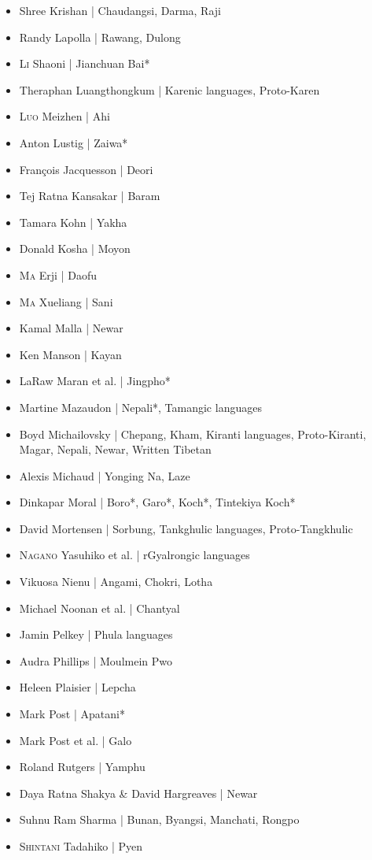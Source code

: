 \begin{itemize}
\item Shree Krishan | Chaudangsi, Darma, Raji
\item Randy Lapolla | Rawang, Dulong
\item \textsc{Li} Shaoni | Jianchuan Bai*
\item Theraphan Luangthongkum | Karenic languages, Proto-Karen
\item \textsc{Luo} Meizhen | Ahi
\item Anton Lustig | Zaiwa*
\item François Jacquesson | Deori
\item Tej Ratna Kansakar | Baram
\item Tamara Kohn | Yakha
\item Donald Kosha | Moyon
\item \textsc{Ma} Erji | Daofu
\item \textsc{Ma} Xueliang | Sani
\item Kamal Malla | Newar
\item Ken Manson | Kayan
\item LaRaw Maran et al. | Jingpho*
\item Martine Mazaudon | Nepali*, Tamangic languages
\item Boyd Michailovsky | Chepang, Kham, Kiranti languages, Proto-Kiranti, Magar, Nepali, Newar, Written Tibetan
\item Alexis Michaud | Yonging Na, Laze
\item Dinkapar Moral | Boro*, Garo*, Koch*, Tintekiya Koch*
\item David Mortensen | Sorbung, Tankghulic languages, Proto-Tangkhulic
\item \textsc{Nagano} Yasuhiko et al. | rGyalrongic languages
\item Vikuosa Nienu | Angami, Chokri, Lotha
\item Michael Noonan et al. | Chantyal
\item Jamin Pelkey | Phula languages
\item Audra Phillips | Moulmein Pwo
\item Heleen Plaisier | Lepcha
\item Mark Post | Apatani*
\item Mark Post et al. | Galo
\item Roland Rutgers | Yamphu
\item Daya Ratna Shakya \& David Hargreaves | Newar
\item Suhnu Ram Sharma | Bunan, Byangsi, Manchati, Rongpo
\item \textsc{Shintani} Tadahiko | Pyen

\end{itemize}
